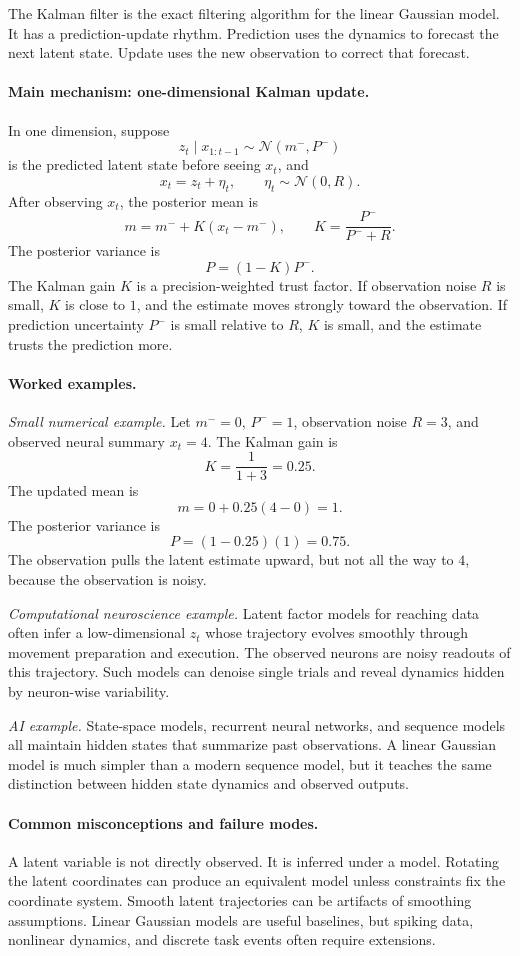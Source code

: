 The Kalman filter is the exact filtering algorithm for the linear Gaussian model. It has a prediction-update rhythm. Prediction uses the dynamics to forecast the next latent state. Update uses the new observation to correct that forecast.

\paragraph{Main mechanism: one-dimensional Kalman update.}
In one dimension, suppose
\[
z_t\mid x_{1:t-1}\sim\mathcal N(m^-,P^-)
\]
is the predicted latent state before seeing \(x_t\), and
\[
x_t=z_t+\eta_t,\qquad \eta_t\sim\mathcal N(0,R).
\]
After observing \(x_t\), the posterior mean is
\[
\boxed{
m=m^-+K(x_t-m^-),
\qquad
K=\frac{P^-}{P^-+R}.
}
\]
The posterior variance is
\[
\boxed{
P=(1-K)P^-.
}
\]
The Kalman gain \(K\) is a precision-weighted trust factor. If observation noise \(R\) is small, \(K\) is close to \(1\), and the estimate moves strongly toward the observation. If prediction uncertainty \(P^-\) is small relative to \(R\), \(K\) is small, and the estimate trusts the prediction more.

\paragraph{Worked examples.}
\emph{Small numerical example.}
Let \(m^-=0\), \(P^-=1\), observation noise \(R=3\), and observed neural summary \(x_t=4\). The Kalman gain is
\[
K=\frac{1}{1+3}=0.25.
\]
The updated mean is
\[
m=0+0.25(4-0)=1.
\]
The posterior variance is
\[
P=(1-0.25)(1)=0.75.
\]
The observation pulls the latent estimate upward, but not all the way to \(4\), because the observation is noisy.

\emph{Computational neuroscience example.}
Latent factor models for reaching data often infer a low-dimensional \(z_t\) whose trajectory evolves smoothly through movement preparation and execution. The observed neurons are noisy readouts of this trajectory. Such models can denoise single trials and reveal dynamics hidden by neuron-wise variability.

\emph{AI example.}
State-space models, recurrent neural networks, and sequence models all maintain hidden states that summarize past observations. A linear Gaussian model is much simpler than a modern sequence model, but it teaches the same distinction between hidden state dynamics and observed outputs.

\paragraph{Common misconceptions and failure modes.}
A latent variable is not directly observed. It is inferred under a model. Rotating the latent coordinates can produce an equivalent model unless constraints fix the coordinate system. Smooth latent trajectories can be artifacts of smoothing assumptions. Linear Gaussian models are useful baselines, but spiking data, nonlinear dynamics, and discrete task events often require extensions.

